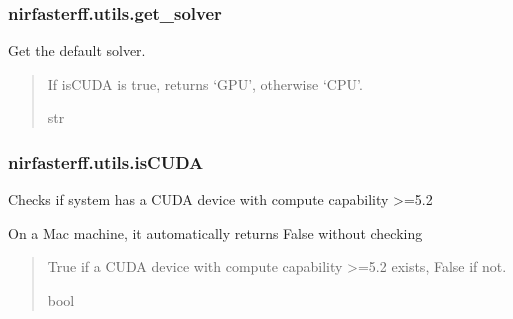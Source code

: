 \documentclass[letterpaper,10pt,english]{sphinxmanual}
\begin{document}
\sphinxstepscope


\subsubsection{nirfasterff.utils.get\_solver}
\label{\detokenize{_autosummary/nirfasterff.utils.get_solver:nirfasterff-utils-get-solver}}\label{\detokenize{_autosummary/nirfasterff.utils.get_solver::doc}}

\begin{fulllineitems}
\label{\detokenize{_autosummary/nirfasterff.utils.get_solver:nirfasterff.utils.get_solver}}
\pysigstartsignatures
{}
\pysigstopsignatures
\sphinxAtStartPar
Get the default solver.
\begin{quote}\begin{description}
\sphinxAtStartPar
If isCUDA is true, returns ‘GPU’, otherwise ‘CPU’.

\sphinxAtStartPar
str

\end{description}\end{quote}

\end{fulllineitems}


\sphinxstepscope


\subsubsection{nirfasterff.utils.isCUDA}
\label{\detokenize{_autosummary/nirfasterff.utils.isCUDA:nirfasterff-utils-iscuda}}\label{\detokenize{_autosummary/nirfasterff.utils.isCUDA::doc}}

\begin{fulllineitems}
\label{\detokenize{_autosummary/nirfasterff.utils.isCUDA:nirfasterff.utils.isCUDA}}
\pysigstartsignatures
{}
\pysigstopsignatures
\sphinxAtStartPar
Checks if system has a CUDA device with compute capability \textgreater{}=5.2

\sphinxAtStartPar
On a Mac machine, it automatically returns False without checking
\begin{quote}\begin{description}
\sphinxAtStartPar
True if a CUDA device with compute capability \textgreater{}=5.2 exists, False if not.

\sphinxAtStartPar
bool

\end{description}\end{quote}

\end{fulllineitems}
\end{document}
